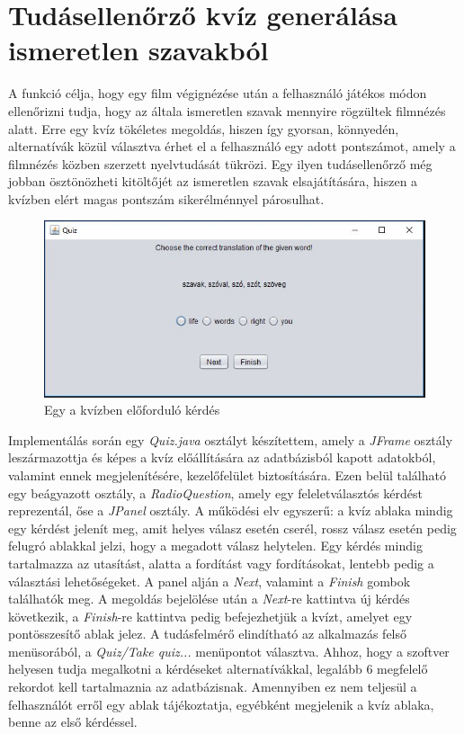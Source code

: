 \section{Tudásellenőrző kvíz generálása ismeretlen szavakból}

A funkció célja, hogy egy film végignézése után a felhasználó játékos módon ellenőrizni tudja, hogy az általa ismeretlen szavak mennyire rögzültek filmnézés alatt. Erre egy kvíz tökéletes megoldás, hiszen így gyorsan, könnyedén, alternatívák közül választva érhet el a felhasználó egy adott pontszámot, amely a filmnézés közben szerzett nyelvtudását tükrözi. Egy ilyen tudásellenőrző még jobban ösztönözheti kitöltőjét az ismeretlen szavak elsajátítására, hiszen a kvízben elért magas pontszám sikerélménnyel párosulhat.

\begin{figure}
  \includegraphics[width=\linewidth]{images/quiz.jpg}
  \caption{Egy a kvízben előforduló kérdés}
  \label{fig:quiz}
\end{figure}

Implementálás során egy \textit{Quiz.java} osztályt készítettem, amely a \textit{JFrame} osztály leszármazottja és képes a kvíz előállítására az adatbázisból kapott adatokból, valamint ennek megjelenítésére, kezelőfelület biztosítására. Ezen belül található egy beágyazott osztály, a \textit{RadioQuestion}, amely egy feleletválasztós kérdést reprezentál, őse a \textit{JPanel} osztály. A működési elv egyszerű: a kvíz ablaka mindig egy kérdést jelenít meg, amit helyes válasz esetén cserél, rossz válasz esetén pedig felugró ablakkal jelzi, hogy a megadott válasz helytelen. Egy kérdés mindig tartalmazza az utasítást, alatta a fordítást vagy fordításokat, lentebb pedig a választási lehetőségeket. A panel alján a \textit{Next}, valamint a \textit{Finish} gombok találhatók meg. A megoldás bejelölése után a \textit{Next}-re kattintva új kérdés következik, a \textit{Finish}-re kattintva pedig befejezhetjük a kvízt, amelyet egy pontösszesítő ablak jelez. A tudásfelmérő elindítható az alkalmazás felső menüsorából, a \textit{Quiz/Take quiz...} menüpontot választva. Ahhoz, hogy a szoftver helyesen tudja megalkotni a kérdéseket alternatívákkal, legalább 6 megfelelő rekordot kell tartalmaznia az adatbázisnak. Amennyiben ez nem teljesül a felhasználót erről egy ablak tájékoztatja, egyébként megjelenik a kvíz ablaka, benne az első kérdéssel.

